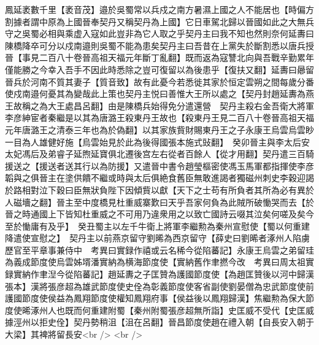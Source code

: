 鳳延袤數千里【袤音茂】邉於吳蜀常以兵戍之南方暑濕上國之人不能居也【時偏方割據者謂中原為上國晉奉契丹又稱契丹為上國】它日車駕北歸以晉國如此之大無兵守之吳蜀必相與乘虚入寇如此豈非為它人取之乎契丹主曰我不知也然則奈何延夀曰陳橋降卒可分以戍南邉則吳蜀不能為患矣契丹主曰吾昔在上黨失於斷割悉以唐兵授晉【事見二百八十卷晉高祖天福元年斷丁亂翻】既而返為寇讐北向與吾戰辛勤累年僅能勝之今幸入吾手不因此時悉除之豈可復留以為後患乎【復扶又翻】延夀曰曏留晉兵於河南不質其妻子【質音致】故有此憂今若悉徙其家於恒定雲朔之間每歲分番使戍南邉何憂其為變哉此上策也契丹主悦曰善惟大王所以處之【契丹封趙延夀為燕王故稱之為大王處昌呂翻】由是陳橋兵始得免分遣還營　契丹主殺右金吾衛大將軍李彦紳宦者秦繼是以其為唐潞王殺東丹王故也【殺東丹王見二百八十卷晉高祖天福元年唐潞王之清泰三年也為於偽翻】以其家族貲財賜東丹王之子永康王烏雲烏雲眇一目為人雄健好施【烏雲始見於此為後得國張本施式䜴翻】　癸卯晉主與李太后安太妃馮后及弟睿子延煦延寶俱北遷後宫左右從者百餘人【從才用翻】契丹遣三百騎援送之【援送者送其行以為防援】又遣晉中書令趙瑩樞密使馮玉馬軍都指揮使李彦韜與之俱晉主在塗供饋不繼或時與太后俱絶食舊臣無敢進謁者獨磁州刺史李穀迎謁於路相對泣下穀曰臣無狀負陛下因傾貲以獻【天下之士苟有所負者其所為必有異於人磁墻之翻】晉主至中度橋見杜重威寨歎曰天乎吾家何負為此賊所破慟哭而去【於晉之時通國上下皆知杜重威之不可用乃違衆用之以致亡國詩云啜其泣矣何嗟及矣今至於慟庸有及乎】　癸丑蜀主以左千牛衛上將軍李繼勲為秦州宣慰使【蜀以何重建降遣使宣慰之】　契丹主以前燕京留守劉晞為西京留守【薛史曰劉晞者涿州人陷虜歷官至平章事兼侍中　考異曰實録作禧或云名稀今從陷蕃記】永康王烏雲之弟留珪為義成節度使烏雲姊壻潘實納為横海節度使【實納舊作聿撚今改　考異曰周太祖實録實納作聿湼今從陷蕃記】趙延夀之子匡贊為護國節度使【為趙匡贊後以河中歸漢張本】漢將張彦超為雄武節度使史佺為彰義節度使客省副使劉晏僧為忠武節度使前護國節度使侯益為鳳翔節度使權知鳳翔府事【侯益後以鳳翔歸漢】焦繼勲為保大節度使晞涿州人也既而何重建附蜀【秦州附蜀張彦超無所詣】史匡威不受代【史匡威據涇州以拒史佺】契丹勢稍沮【沮在呂翻】晉昌節度使趙在禮入朝【自長安入朝于大梁】其裨將留長安<br />
<br />
